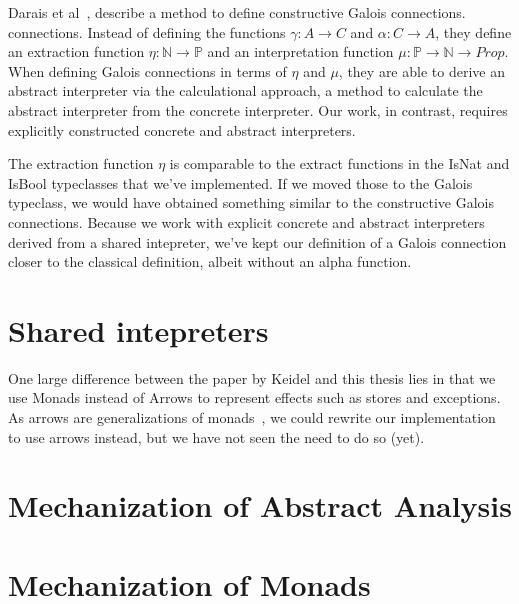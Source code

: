 Darais et al~\cite{darais2019constructive}, describe a method to define
constructive Galois connections.
connections. Instead of defining the functions $\gamma : A \rightarrow C$ 
and $\alpha : C \rightarrow A$, they define an extraction function 
$\eta : \mathbb N \rightarrow \mathbb P $ and
an interpretation function $\mu : \mathbb P \rightarrow \mathbb N \rightarrow
Prop$. When defining Galois connections in terms of $\eta$ and $\mu$, they
are able to derive an abstract interpreter via the calculational approach, a
method to calculate the abstract interpreter from the concrete interpreter.
Our work, in contrast, requires explicitly constructed concrete and abstract
interpreters.

The extraction function $\eta$ is comparable to the extract functions in the
IsNat and IsBool typeclasses that we've implemented. If we moved those to the
Galois typeclass, we would have obtained something similar to the constructive
Galois connections. Because we work with explicit concrete and abstract
interpreters derived from a shared intepreter, we've kept our definition of a
Galois connection closer to the classical definition, albeit without an alpha
function.


\section{Shared intepreters}

One large difference between the paper by Keidel\cite{keidel2018compositional}
and this thesis lies in that we use Monads instead of Arrows to represent 
effects such as stores and exceptions. As
arrows are generalizations of monads~\cite{hughes2000generalising}, we could
rewrite our implementation to use arrows instead, but we have not seen the need
to do so (yet).

\section{Mechanization of Abstract Analysis}

\section{Mechanization of Monads}
